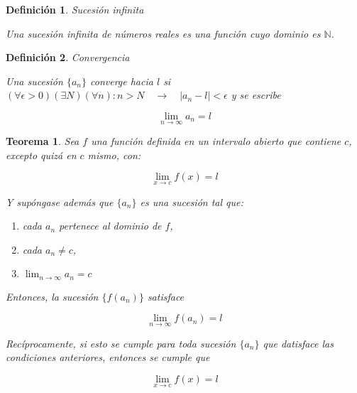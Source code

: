 \message{ !name(analisis-mat.tex)}\documentclass[12pt,a4paper]{article}
\newtheorem{mydef}{Definici\'on}[section]
\newtheorem{theorem}{Teorema}[section]
\begin{document}
\begin{mydef}{Sucesi\'on infinita}

Una sucesi\'on infinita de n\'umeros reales es una funci\'on cuyo
dominio es \(\mathbb{N}\).
\end{mydef}

\begin{mydef}{Convergencia}

Una sucesi\'on \( \{ a_n \} \) \emph{converge hacia \( l \)} si  \(
(\forall \epsilon > 0) (\exists N) (\forall n)  :   n > N
\quad \to \quad | a_n - l | < \epsilon \) y se escribe 

\[ \lim_{n \to \infty} a_n = l \]


\end{mydef}


\begin{theorem}
Sea \( f \) una funci\'on definida en un intervalo abierto que contiene
\( c \), excepto quiz\'a en \( c \) mismo, con:

\[ \lim_{x \to c} f(x) = l \]

Y sup\'ongase adem\'as que \( \{ a_n \} \) es una sucesi\'on tal que:
\begin{enumerate}
\item cada \( a_n \) pertenece al dominio de \( f \),
\item cada \( a_n \neq c \),
\item \(\lim_{n \to \infty} a_n = c\)
\end{enumerate}

Entonces, la sucesi\'on \( \{ f(a_n) \} \) satisface

\[ \lim_{n \to \infty} f(a_n) = l\]

Rec\'iprocamente, si esto se cumple para toda sucesi\'on \( \{ a_n \}
\) que datisface las condiciones anteriores, entonces se cumple que

\[ \lim_{x \to c} f(x) = l \]


\end{theorem}
\end{document}
